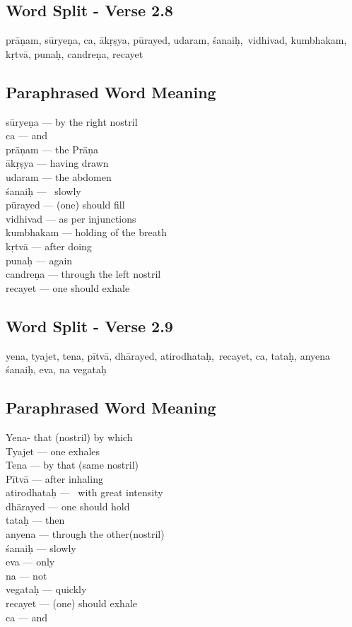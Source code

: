 \subsection*{Word Split - Verse 2.8}


prāṇam, sūryeṇa, ca, ākṛṣya, pūrayed, udaram, śanaiḥ, vidhivad, kumbhakam, kṛtvā, punaḥ, candreṇa, recayet

\subsection*{Paraphrased Word Meaning}


\begin{multicols}{2}
sūryeṇa --- by the right nostril \\
ca --- and \\
prāṇam --- the Prāṇa \\
ākṛṣya --- having drawn \\
udaram --- the abdomen \\
śanaiḥ ---  slowly \\
pūrayed --- (one) should fill \\
vidhivad --- as per injunctions \\
kumbhakam --- holding of the breath\\
kṛtvā --- after doing \\
punaḥ --- again \\
candreṇa --- through the left nostril \\
recayet --- one should exhale
\end{multicols}

\subsection*{Word Split - Verse 2.9}


yena, tyajet, tena, pītvā, dhārayed, atirodhataḥ, recayet, ca,  tataḥ, anyena śanaiḥ, eva, na vegataḥ

\subsection*{Paraphrased Word Meaning}


\begin{multicols}{2}
Yena- that (nostril) by which\\
Tyajet --- one exhales\\
Tena --- by that (same nostril) \\
Pītvā --- after inhaling \\
atirodhataḥ ---  with great intensity \\
dhārayed --- one should hold \\
tataḥ ---  then \\
anyena --- through the other(nostril)\\
śanaiḥ --- slowly\\
eva --- only\\
na --- not \\
vegataḥ --- quickly \\
recayet --- (one) should exhale \\
ca  --- and
\end{multicols}

